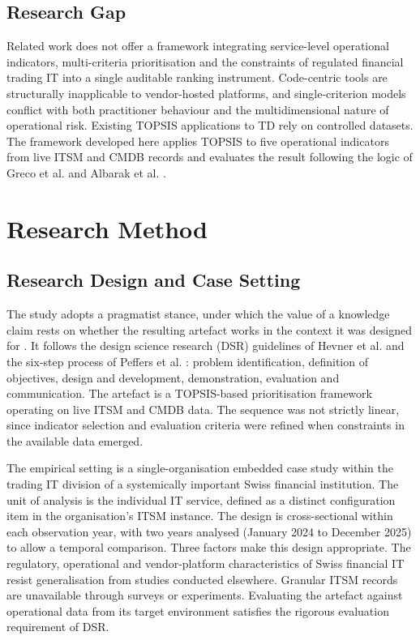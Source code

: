 \documentclass[
  journal,
]{IEEEtran}%
\begin{document}
\subsection{Research Gap}\label{research-gap}

Related work does not offer a framework integrating service-level
operational indicators, multi-criteria prioritisation and the
constraints of regulated financial trading IT into a single auditable
ranking instrument. Code-centric tools are structurally inapplicable to
vendor-hosted platforms, and single-criterion models conflict with both
practitioner behaviour and the multidimensional nature of operational
risk. Existing TOPSIS applications to TD rely on controlled datasets.
The framework developed here applies TOPSIS to five operational
indicators from live ITSM and CMDB records and evaluates the result
following the logic of Greco et al.
 and
Albarak et al.
.

\section{Research Method}\label{sec-method}

\subsection{Research Design and Case
Setting}\label{research-design-and-case-setting}

The study adopts a pragmatist stance, under which the value of a
knowledge claim rests on whether the resulting artefact works in the
context it was designed for
. It follows
the design science research (DSR) guidelines of Hevner et al.
 and the
six-step process of Peffers et al.
: problem
identification, definition of objectives, design and development,
demonstration, evaluation and communication. The artefact is a
TOPSIS-based prioritisation framework operating on live ITSM and CMDB
data. The sequence was not strictly linear, since indicator selection
and evaluation criteria were refined when constraints in the available
data emerged.

The empirical setting is a single-organisation embedded case study
within the trading IT division of a systemically important Swiss
financial institution. The unit of analysis is the individual IT
service, defined as a distinct configuration item in the organisation's
ITSM instance. The design is cross-sectional within each observation
year, with two years analysed (January 2024 to December 2025) to allow a
temporal comparison. Three factors make this design appropriate. The
regulatory, operational and vendor-platform characteristics of Swiss
financial IT resist generalisation from studies conducted elsewhere.
Granular ITSM records are unavailable through surveys or experiments.
Evaluating the artefact against operational data from its target
environment satisfies the rigorous evaluation requirement of DSR.
\end{document}
